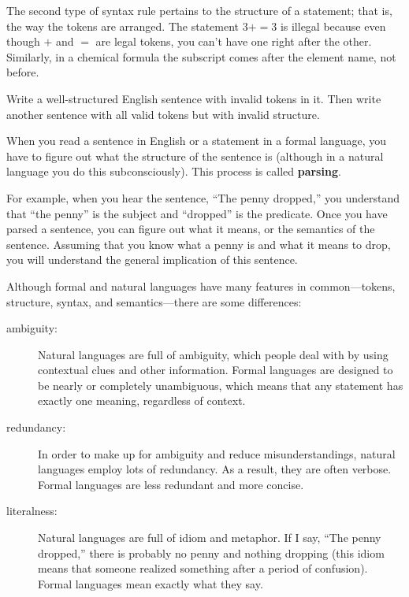 \documentclass[10pt]{book}
\begin{document}
The second type of syntax rule pertains to the structure of a
statement; that is, the way the tokens are arranged.  The statement
$3 + = 3$ is illegal because even though $+$ and $=$ are
legal tokens, you can't have one right after the other.  Similarly,
in a chemical formula the subscript comes after the element name, not
before.

\begin{exercise}

Write a well-structured English
sentence with invalid tokens in it.  Then write another sentence
with all valid tokens but with invalid structure.

\end{exercise}

When you read a sentence in English or a statement in a formal
language, you have to figure out what the structure of the sentence is
(although in a natural language you do this subconsciously).  This
process is called {\bf parsing}.

For example, when you hear the sentence, ``The penny dropped,'' you
understand that ``the penny'' is the subject and ``dropped'' is the
predicate.  Once you have parsed a sentence, you can figure out what it
means, or the semantics of the sentence.  Assuming that you know
what a penny is and what it means to drop, you will understand the
general implication of this sentence.

Although formal and natural languages have many features in
common---tokens, structure, syntax, and semantics---there are some
differences:

\begin{description}

\item[ambiguity:] Natural languages are full of ambiguity, which
people deal with by using contextual clues and other information.
Formal languages are designed to be nearly or completely unambiguous,
which means that any statement has exactly one meaning,
regardless of context.

\item[redundancy:] In order to make up for ambiguity and reduce
misunderstandings, natural languages employ lots of
redundancy.  As a result, they are often verbose.  Formal languages
are less redundant and more concise.

\item[literalness:] Natural languages are full of idiom and metaphor.
If I say, ``The penny dropped,'' there is probably no penny and
nothing dropping (this idiom means that someone realized something
after a period of confusion).  Formal languages
mean exactly what they say.

\end{description}
\end{document}
